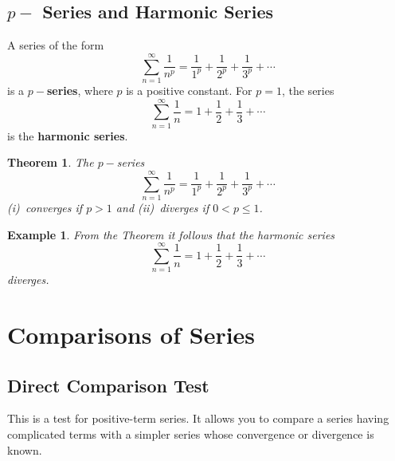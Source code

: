 \documentclass[titlepage,a4paper,12pt]{report}
\newtheorem{example}{Example}[section]
\newtheorem{theorem}{Theorem}[section]
\begin{document}
\subsection{$p-$ Series and Harmonic Series}
A series of the form 
\[\sum _{n=1}^\infty \dfrac{1}{n^p}=\dfrac{1}{1^p}+\dfrac{1}{2^p}+\dfrac{1}{3^p}+\cdots\] is a \textbf{$p-$series}, where $p$ is a positive constant. For $p=1$, the series 
\[\sum _{n=1}^\infty \dfrac{1}{n}=1+\dfrac{1}{2}+\dfrac{1}{3}+\cdots\] is the \textbf{harmonic series}.
\begin{theorem}
The $p-$series 
\[\sum _{n=1}^\infty \dfrac{1}{n^p}=\dfrac{1}{1^p}+\dfrac{1}{2^p}+\dfrac{1}{3^p}+\cdots\] (i)\, converges if $p>1$ and (ii)\, diverges if $0<p\leq 1$.
\end{theorem}
\begin{example}
From the Theorem it follows that the harmonic series \[\sum _{n=1}^\infty \dfrac{1}{n}=1+\dfrac{1}{2}+\dfrac{1}{3}+\cdots\] diverges.
\end{example}
\section{Comparisons of Series}
\subsection{Direct Comparison Test}
This is  a test for positive-term series. It allows you to compare a series having complicated terms with a simpler series whose convergence or divergence is known.
\end{document}
